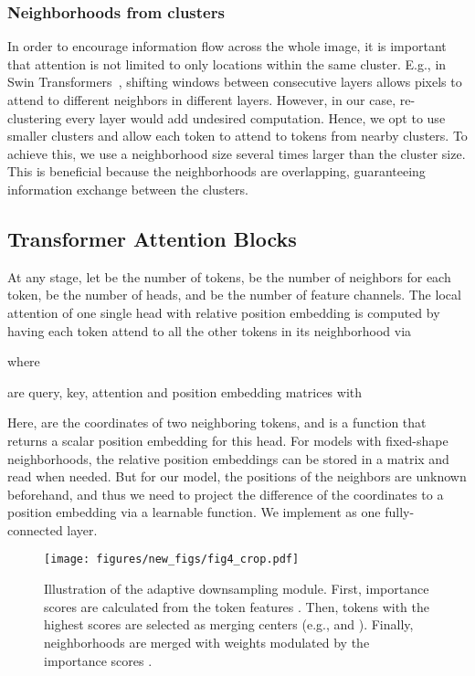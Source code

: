 \documentclass[10pt,twocolumn,letterpaper]{article}
\begin{document}
\subsubsection{Neighborhoods from clusters} In order to encourage information flow across the whole image, it is important that attention is not limited to only locations within the same cluster. E.g., in Swin Transformers~\cite{swin}, shifting windows between consecutive layers allows pixels to attend to different neighbors in different layers. However, in our case, re-clustering every layer would add undesired computation. Hence, we opt to use 
smaller clusters and allow each token to attend to tokens from  nearby clusters. To achieve this, we use a neighborhood size several times larger than the cluster size. This is beneficial because the neighborhoods are overlapping, guaranteeing  information exchange between the clusters. 






\subsection{Transformer Attention Blocks}\label{sec:attention}
At any stage, let  be the number of tokens,  be the number of neighbors for each token,  be the number of heads, and  be the number of feature channels. 
The local attention  of one single head with relative position embedding is computed by having each token attend to all the other tokens in its neighborhood via

where 
 
are query, key, attention and position embedding matrices with

Here,  are the  coordinates of two neighboring tokens, and  is a function that returns a scalar position embedding for this head. For models with fixed-shape neighborhoods, the relative position embeddings can be stored in a matrix and read when needed. But for our model, the positions of the neighbors are unknown beforehand, and thus we need to project the difference of the coordinates to a position embedding via a learnable function. We implement  as one fully-connected layer.


\begin{figure}
\centering
\texttt{[image: figures/new\_figs/fig4\_crop.pdf]}
\vskip -0.15in 
\caption{Illustration of the adaptive downsampling module. First, importance scores  are calculated from the token features . Then, tokens with the highest scores are selected as merging centers (e.g.,  and ). Finally, neighborhoods are merged with weights modulated by the importance scores .}
\label{fig:merge}
\vskip -0.1in
\end{figure}
\end{document}
